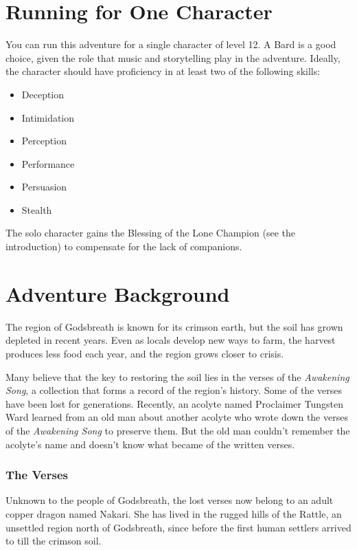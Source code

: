 \documentclass[letterpaper, 11pt, twocolumn]{dndbook}
\begin{document}
\section{Running for One Character}

You can run this adventure for a single character of level 12. A Bard is a good choice, given the role that music and storytelling play in the adventure. Ideally, the character should have proficiency in at least two of the following skills:

\begin{itemize}
\item Deception
\item Intimidation
\item Perception
\item Performance
\item Persuasion
\item Stealth
\end{itemize}

The solo character gains the Blessing of the Lone Champion (see the introduction) to compensate for the lack of companions.
\section{Adventure Background}

The region of Godsbreath is known for its crimson earth, but the soil has grown depleted in recent years. Even as locals develop new ways to farm, the harvest produces less food each year, and the region grows closer to crisis.

Many believe that the key to restoring the soil lies in the verses of the \textit{Awakening Song}, a collection that forms a record of the region's history. Some of the verses have been lost for generations. Recently, an acolyte named Proclaimer Tungsten Ward learned from an old man about another acolyte who wrote down the verses of the \textit{Awakening Song} to preserve them. But the old man couldn't remember the acolyte's name and doesn't know what became of the written verses.

\subsubsection{The Verses}

Unknown to the people of Godsbreath, the lost verses now belong to an adult copper dragon named Nakari. She has lived in the rugged hills of the Rattle, an unsettled region north of Godsbreath, since before the first human settlers arrived to till the crimson soil.
\end{document}
